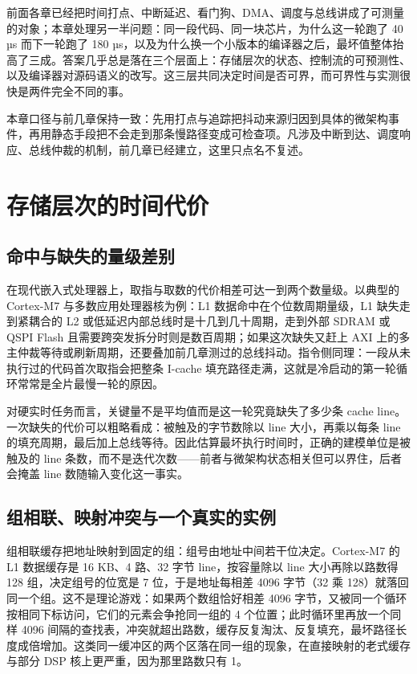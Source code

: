\documentclass[12pt,a4paper,fontset=fandol]{ctexbook}
\begin{document}
前面各章已经把时间打点、中断延迟、看门狗、DMA、调度与总线讲成了可测量的对象；本章处理另一半问题：同一段代码、同一块芯片，为什么这一轮跑了 40 µs 而下一轮跑了 180 µs，以及为什么换一个小版本的编译器之后，最坏值整体抬高了三成。答案几乎总是落在三个层面上：存储层次的状态、控制流的可预测性、以及编译器对源码语义的改写。这三层共同决定时间是否可界，而可界性与实测很快是两件完全不同的事。

本章口径与前几章保持一致：先用打点与追踪把抖动来源归因到具体的微架构事件，再用静态手段把不会走到那条慢路径变成可检查项。凡涉及中断到达、调度响应、总线仲裁的机制，前几章已经建立，这里只点名不复述。

\section{存储层次的时间代价}
\label{sec:ch13-memhier}

\subsection{命中与缺失的量级差别}

在现代嵌入式处理器上，取指与取数的代价相差可达一到两个数量级。以典型的 Cortex-M7 与多数应用处理器核为例：L1 数据命中在个位数周期量级，L1 缺失走到紧耦合的 L2 或低延迟内部总线时是十几到几十周期，走到外部 SDRAM 或 QSPI Flash 且需要跨突发拆分时则是数百周期；如果这次缺失又赶上 AXI 上的多主仲裁等待或刷新周期，还要叠加前几章测过的总线抖动。指令侧同理：一段从未执行过的代码首次取指会把整条 I-cache 填充路径走满，这就是冷启动的第一轮循环常常是全片最慢一轮的原因。

对硬实时任务而言，关键量不是平均值而是这一轮究竟缺失了多少条 cache line。一次缺失的代价可以粗略看成：被触及的字节数除以 line 大小，再乘以每条 line 的填充周期，最后加上总线等待。因此估算最坏执行时间时，正确的建模单位是被触及的 line 条数，而不是迭代次数——前者与微架构状态相关但可以界住，后者会掩盖 line 数随输入变化这一事实。

\subsection{组相联、映射冲突与一个真实的实例}

组相联缓存把地址映射到固定的组：组号由地址中间若干位决定。Cortex-M7 的 L1 数据缓存是 16 KB、4 路、32 字节 line，按容量除以 line 大小再除以路数得 128 组，决定组号的位宽是 7 位，于是地址每相差 4096 字节（32 乘 128）就落回同一个组。这不是理论游戏：如果两个数组恰好相差 4096 字节，又被同一个循环按相同下标访问，它们的元素会争抢同一组的 4 个位置；此时循环里再放一个同样 4096 间隔的查找表，冲突就超出路数，缓存反复淘汰、反复填充，最坏路径长度成倍增加。这类同一缓冲区的两个区落在同一组的现象，在直接映射的老式缓存与部分 DSP 核上更严重，因为那里路数只有 1。
\end{document}
